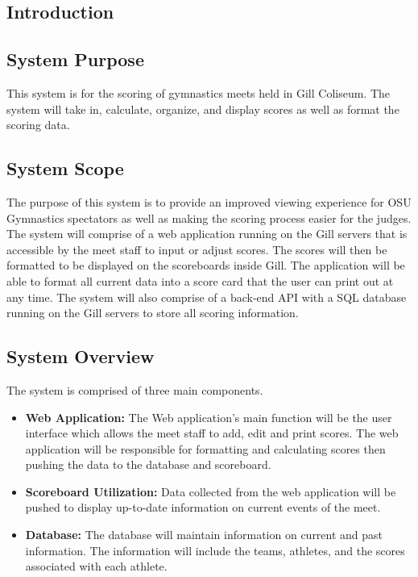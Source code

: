 \documentclass[letterpaper,10pt,draftclsnofoot,onecolumn,]{article}
\begin{document}
\begin{center}
\section{Introduction}
\end{center}

\subsection{System Purpose}
This system is for the scoring of gymnastics meets held in Gill Coliseum. The system will take in, calculate, organize, and display scores as well as format the scoring data.

\subsection{System Scope}
The purpose of this system is to provide an improved viewing experience for OSU Gymnastics spectators as well as making the scoring process easier for the judges. The system will comprise of a web application running on the Gill servers that is accessible by the meet staff to input or adjust scores. The scores will then be formatted to be displayed on the scoreboards inside Gill. The application will be able to format all current data into a score card that the user can print out at any time. The system will also comprise of a back-end API with a SQL database running on the Gill servers to store all scoring information.

\subsection{System Overview}
The system is comprised of three main components.
\begin{itemize}
    \item \textbf{Web Application:}
          The Web application's main function will be the user interface which allows the meet staff to add, edit and print scores. The web application will be responsible for formatting and calculating scores then pushing the data to the database and scoreboard.
    \item \textbf{Scoreboard Utilization:}
          Data collected from the web application will be pushed to display up-to-date information on current events of the meet.
    \item \textbf{Database:}
          The database will maintain information on current and past information. The information will include the teams, athletes, and the scores associated with each athlete.
\end{itemize}
\end{document}
